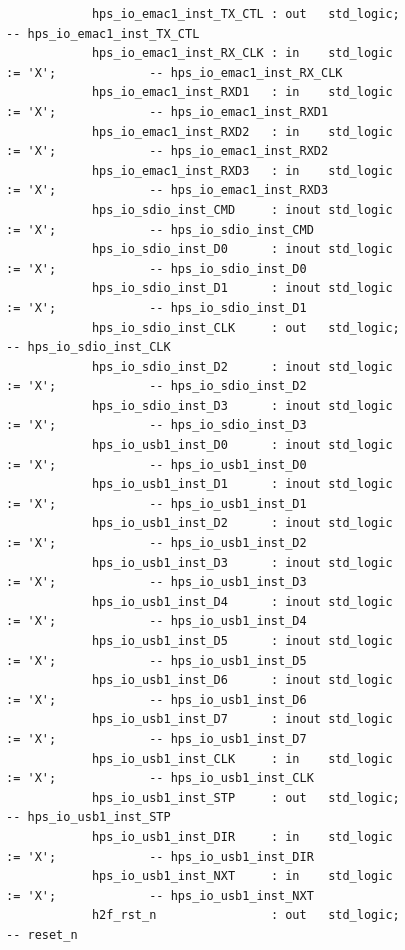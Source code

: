 \documentclass[conference]{IEEEtran}
\begin{document}
\begin{lstlisting}
			hps_io_emac1_inst_TX_CTL : out   std_logic;                                        -- hps_io_emac1_inst_TX_CTL
			hps_io_emac1_inst_RX_CLK : in    std_logic                     := 'X';             -- hps_io_emac1_inst_RX_CLK
			hps_io_emac1_inst_RXD1   : in    std_logic                     := 'X';             -- hps_io_emac1_inst_RXD1
			hps_io_emac1_inst_RXD2   : in    std_logic                     := 'X';             -- hps_io_emac1_inst_RXD2
			hps_io_emac1_inst_RXD3   : in    std_logic                     := 'X';             -- hps_io_emac1_inst_RXD3
			hps_io_sdio_inst_CMD     : inout std_logic                     := 'X';             -- hps_io_sdio_inst_CMD
			hps_io_sdio_inst_D0      : inout std_logic                     := 'X';             -- hps_io_sdio_inst_D0
			hps_io_sdio_inst_D1      : inout std_logic                     := 'X';             -- hps_io_sdio_inst_D1
			hps_io_sdio_inst_CLK     : out   std_logic;                                        -- hps_io_sdio_inst_CLK
			hps_io_sdio_inst_D2      : inout std_logic                     := 'X';             -- hps_io_sdio_inst_D2
			hps_io_sdio_inst_D3      : inout std_logic                     := 'X';             -- hps_io_sdio_inst_D3
			hps_io_usb1_inst_D0      : inout std_logic                     := 'X';             -- hps_io_usb1_inst_D0
			hps_io_usb1_inst_D1      : inout std_logic                     := 'X';             -- hps_io_usb1_inst_D1
			hps_io_usb1_inst_D2      : inout std_logic                     := 'X';             -- hps_io_usb1_inst_D2
			hps_io_usb1_inst_D3      : inout std_logic                     := 'X';             -- hps_io_usb1_inst_D3
			hps_io_usb1_inst_D4      : inout std_logic                     := 'X';             -- hps_io_usb1_inst_D4
			hps_io_usb1_inst_D5      : inout std_logic                     := 'X';             -- hps_io_usb1_inst_D5
			hps_io_usb1_inst_D6      : inout std_logic                     := 'X';             -- hps_io_usb1_inst_D6
			hps_io_usb1_inst_D7      : inout std_logic                     := 'X';             -- hps_io_usb1_inst_D7
			hps_io_usb1_inst_CLK     : in    std_logic                     := 'X';             -- hps_io_usb1_inst_CLK
			hps_io_usb1_inst_STP     : out   std_logic;                                        -- hps_io_usb1_inst_STP
			hps_io_usb1_inst_DIR     : in    std_logic                     := 'X';             -- hps_io_usb1_inst_DIR
			hps_io_usb1_inst_NXT     : in    std_logic                     := 'X';             -- hps_io_usb1_inst_NXT
			h2f_rst_n                : out   std_logic;                                        -- reset_n

\end{lstlisting}
\end{document}
